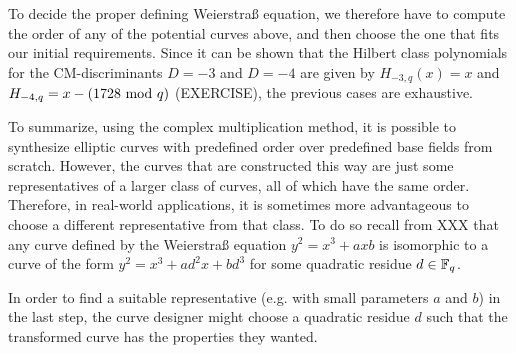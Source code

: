 To decide the proper defining Weierstraß equation, we therefore have to compute the order of any of the potential curves above, and then choose the one that fits our initial requirements. Since it can be shown that the Hilbert class polynomials for the CM-discriminants $D=-3$ and $D=-4$ are given by  $H_{-3,q}(x)=x$ and $H_{-4,q}= x-(1728 \text{ mod } q)$ (EXERCISE), the previous cases are exhaustive.

To summarize, using the complex multiplication method, it is possible to synthesize elliptic curves with predefined order over predefined base fields from scratch. However, the curves that are constructed this way are just some representatives of a larger class of curves, all of which have the same order. Therefore, in real-world applications, it is sometimes more advantageous to choose a different representative from that class. To do so recall from XXX that any curve defined by the Weierstraß equation $y^2 = x^3 + ax b$ is isomorphic to a curve of the form $y^2 = x^3 + ad^2 x + bd^3$ for some quadratic residue $d\in \mathbb{F}_q$. 

In order to find a suitable representative (e.g. with small parameters $a$ and $b$) in the last step, the curve designer might choose a quadratic residue $d$ such that the transformed curve has the properties they wanted.

